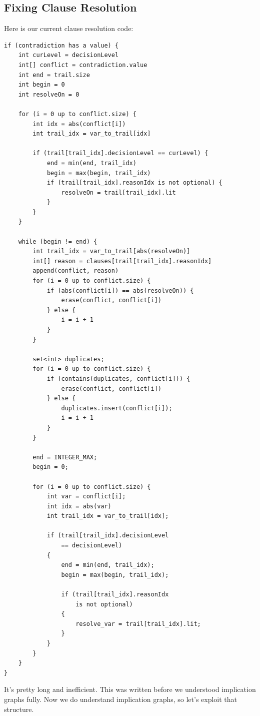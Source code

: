 \documentclass[../main.tex]{subfiles}
\begin{document}
\subsection{Fixing Clause Resolution}

Here is our current clause resolution code:
\begin{lstlisting}
if (contradiction has a value) {
    int curLevel = decisionLevel
    int[] conflict = contradiction.value
    int end = trail.size
    int begin = 0
    int resolveOn = 0

    for (i = 0 up to conflict.size) {
        int idx = abs(conflict[i])
        int trail_idx = var_to_trail[idx]

        if (trail[trail_idx].decisionLevel == curLevel) {
            end = min(end, trail_idx)
            begin = max(begin, trail_idx)
            if (trail[trail_idx].reasonIdx is not optional) {
                resolveOn = trail[trail_idx].lit
            }
        }
    }

    while (begin != end) {
        int trail_idx = var_to_trail[abs(resolveOn)]
        int[] reason = clauses[trail[trail_idx].reasonIdx]
        append(conflict, reason)
        for (i = 0 up to conflict.size) {
            if (abs(conflict[i]) == abs(resolveOn)) {
                erase(conflict, conflict[i])
            } else {
                i = i + 1
            }
        }

        set<int> duplicates;
        for (i = 0 up to conflict.size) {
            if (contains(duplicates, conflict[i])) {
                erase(conflict, conflict[i])
            } else {
                duplicates.insert(conflict[i]);
                i = i + 1
            }
        }

        end = INTEGER_MAX;
        begin = 0;

        for (i = 0 up to conflict.size) {
            int var = conflict[i];
            int idx = abs(var)
            int trail_idx = var_to_trail[idx];

            if (trail[trail_idx].decisionLevel 
                == decisionLevel)
            {
                end = min(end, trail_idx);
                begin = max(begin, trail_idx);

                if (trail[trail_idx].reasonIdx 
                    is not optional)
                {
                    resolve_var = trail[trail_idx].lit;
                }
            }
        }
    } 
}
\end{lstlisting}
\noindent
It's pretty long and inefficient. This was written before we understood implication
graphs fully. Now we do understand implication graphs, so let's exploit that structure.
\end{document}
